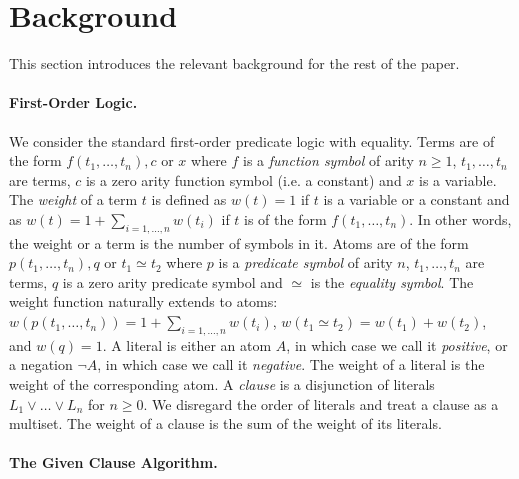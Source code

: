 \documentclass{llncs}
\newcommand{\orl}{\vee}
\newcommand{\notl}{\neg}
\newcommand{\eql}{\simeq}           %
\newcommand{\neql}{\not\simeq}           %
\begin{document}
\section{Background} \label{sec:background}

This section introduces the relevant background for the rest of the paper.

\paragraph{First-Order Logic.} We consider the standard first-order predicate logic with
equality. Terms are of the form $f(t_1,\ldots,t_n), c$ or $x$ where
$f$ is a \emph{function symbol} of arity $n \geq 1$, $t_1,\ldots, t_n$ are terms, $c$ is a zero arity function symbol (i.e. a constant) and $x$ is a variable. 
%
The \emph{weight} of a term $t$ is defined as $w(t) =1$ if $t$ is a variable or a constant
and as $w(t) = 1+\sum_{i=1,\ldots,n} w(t_i)$ if $t$ is of the form
$f(t_1,\ldots,t_n)$. In other words, the weight or a term is the
number of symbols in it.
%
Atoms are of the form $p(t_1,\ldots,t_n), q$ or $t_1 \eql t_2$ where $p$ is a \emph{predicate symbol} of arity $n$, $t_1, \ldots, t_n$ are terms, $q$ is a zero arity predicate symbol and $\eql$ is the \emph{equality symbol}. 
%
The weight function naturally extends to atoms: $w(p(t_1,\ldots,t_n)) = 1+\sum_{i=1,\ldots,n} w(t_i)$, $w(t_1 \eql t_2) = w(t_1)+w(t_2)$,
and $w(q)=1$.
%
A literal is either an atom $A$, in which case we call it \emph{positive}, or a negation $\notl A$,
in which case we call it \emph{negative}.
%
The weight of a literal is the weight of the corresponding atom. 
% 
%
A \emph{clause} is a disjunction of literals $L_1 \orl \ldots \orl L_n$ for $n \geq 0$.
We disregard the order of literals and treat a clause as a multiset. 
%
The weight of a clause is the sum of the weight of its literals. 

\paragraph{The Given Clause Algorithm.}
\end{document}
